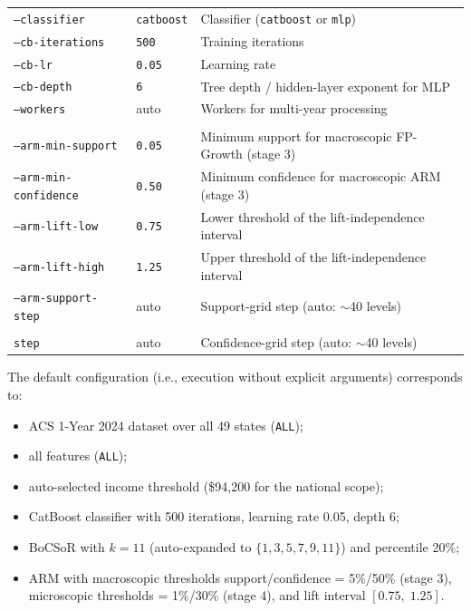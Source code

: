 \begin{table}[htbp]
\begin{tabular}{>{\raggedright\arraybackslash}p{} >{\raggedright\arraybackslash}p{} >{\raggedright\arraybackslash}p{}}
  \texttt{--classifier} & \texttt{catboost} & Classifier (\texttt{catboost} or \texttt{mlp}) \\
  \texttt{--cb-iterations} & \texttt{500}  & Training iterations \\
  \texttt{--cb-lr}      & \texttt{0.05}     & Learning rate \\
  \texttt{--cb-depth}   & \texttt{6}        & Tree depth / hidden-layer exponent for MLP \\
  \texttt{--workers}    & auto              & Workers for multi-year processing \\
  \midrule
  \multicolumn{3}{l}{\textit{ARM (stage 3--4)}} \\
  \texttt{--arm-min-sup\-port}  & \texttt{0.05} & Minimum support for macroscopic FP-Growth (stage 3) \\
  \texttt{--arm-min-\allowbreak confidence} & \texttt{0.50} & Minimum confidence for macroscopic ARM (stage 3) \\
  \texttt{--arm-lift-low}       & \texttt{0.75} & Lower threshold of the lift-independence interval \\
  \texttt{--arm-lift-high}      & \texttt{1.25} & Upper threshold of the lift-independence interval \\
  \texttt{--arm-sup\-port-step} & auto          & Support-grid step (auto: $\sim$40 levels) \\
  \shortstack[l]{\texttt{--arm-confidence-}\\\texttt{step}} & auto & Confidence-grid step (auto: $\sim$40 levels) \\
  \bottomrule
\end{tabular}
\renewcommand{\arraystretch}{1.0}
\end{table}

The default configuration (i.e., execution without explicit arguments) corresponds to:
\begin{itemize}
  \item ACS 1-Year 2024 dataset over all 49 states (\texttt{ALL});
  \item all features (\texttt{ALL});
  \item auto-selected income threshold (\$94,200 for the national scope);
  \item CatBoost classifier with 500 iterations, learning rate 0.05, depth 6;
  \item BoCSoR with $k=11$ (auto-expanded to $\{1,3,5,7,9,11\}$) and percentile 20\%;
  \item ARM with macroscopic thresholds support/confidence = 5\%/50\% (stage 3), microscopic thresholds = 1\%/30\% (stage 4), and lift interval $[0.75,\allowbreak\;1.25]$.
\end{itemize}

